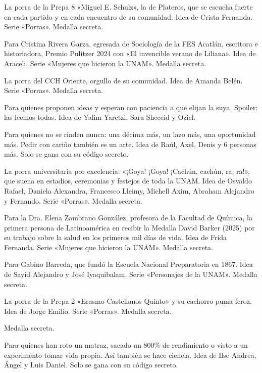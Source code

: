 \begin{description}[leftmargin=1.4cm, style=nextline]
  \item[P0RR4P8] La porra de la Prepa 8 «Miguel E. Schulz», la de Plateros, que se escucha fuerte en cada partido y en cada encuentro de su comunidad. Idea de Crista Fernanda. Serie «Porras». Medalla secreta.
  \item[R1V3R4G] Para Cristina Rivera Garza, egresada de Sociología de la FES Acatlán, escritora e historiadora, Premio Pulitzer 2024 con «El invencible verano de Liliana». Idea de Araceli. Serie «Mujeres que hicieron la UNAM». Medalla secreta.
  \item[P0RR4OTE] La porra del CCH Oriente, orgullo de su comunidad. Idea de Amanda Belén. Serie «Porras». Medalla secreta.
  \item[3SP3R4ND0] Para quienes proponen ideas y esperan con paciencia a que elijan la suya. Spoiler: las leemos todas. Idea de Yalim Yaretzi, Sara Sheccid y Oziel.
  \item[M1G4J4S] Para quienes no se rinden nunca: una décima más, un lazo más, una oportunidad más. Pedir con cariño también es un arte. Idea de Raúl, Axel, Denis y 6 personas más. Solo se gana con su código secreto.
  \item[G0Y4G0Y4] La porra universitaria por excelencia: «¡Goya! ¡Goya! ¡Cachún, cachún, ra, ra!», que suena en estadios, ceremonias y festejos de toda la UNAM. Idea de Osvaldo Rafael, Daniela Alexandra, Francesco Lleimy, Michell Axim, Abraham Alejandro y Fernando. Serie «Porras». Medalla secreta.
  \item[Z4MBR4N0] Para la Dra. Elena Zambrano González, profesora de la Facultad de Química, la primera persona de Latinoamérica en recibir la Medalla David Barker (2025) por su trabajo sobre la salud en los primeros mil días de vida. Idea de Frida Fernanda. Serie «Mujeres que hicieron la UNAM». Medalla secreta.
  \item[B4RR3D4] Para Gabino Barreda, que fundó la Escuela Nacional Preparatoria en 1867. Idea de Sayid Alejandro y José Iyaquibalam. Serie «Personajes de la UNAM». Medalla secreta.
  \item[F3ROZP2] La porra de la Prepa 2 «Erasmo Castellanos Quinto» y su cachorro puma feroz. Idea de Jorge Emilio. Serie «Porras». Medalla secreta.
  \item[P0RR4SUR] Medalla secreta.
  \item[3XP3R1M] Para quienes han roto un matraz, sacado un 800\% de rendimiento o visto a un experimento tomar vida propia. Así también se hace ciencia. Idea de Ilse Andrea, Ángel y Luis Daniel. Solo se gana con su código secreto.

\end{description}
